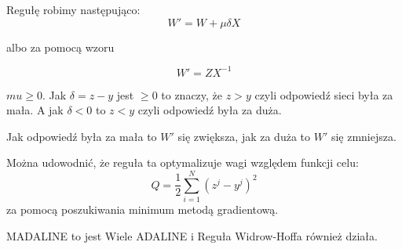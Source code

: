 Regułę robimy następująco:
\begin{equation}
 W' = W + \mu \delta X
\end{equation}

albo za pomocą wzoru 

\begin{equation}
 W' = Z X^{-1}
\end{equation}

$mu \ge 0$. Jak $\delta = z - y$ jest $\ge 0$ to znaczy, że $z > y$ czyli odpowiedź sieci była za mała.
A jak $\delta < 0 $ to $ z < y $ czyli odpowiedź była za duża.

Jak odpowiedź była za mała to $W'$ się zwiększa, jak za duża to $W'$ się zmniejsza.

Można udowodnić, że reguła ta optymalizuje wagi względem funkcji celu:
\begin{equation}
 Q = \frac{1}{2} \sum_{i=1}^N {(z^j - y^j)}^2
\end{equation}
za pomocą poszukiwania minimum metodą gradientową.

MADALINE to jest Wiele ADALINE i Reguła Widrow-Hoffa również działa.